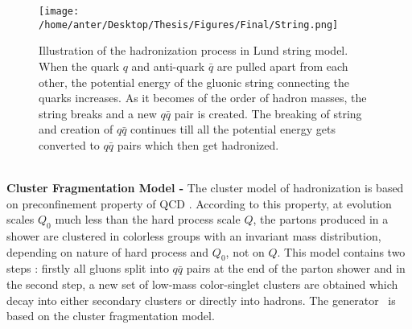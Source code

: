 \begin{figure}[!h]
\begin{center}
\hspace*{-4mm}
\texttt{[image: /home/anter/Desktop/Thesis/Figures/Final/String.png]}\\
\vspace*{4mm}
\caption[Illustration of the hadronization process in Lund string model.]{Illustration of the hadronization process in Lund string model\footnotemark. When the quark $q$ and anti-quark $\bar{q}$ are pulled apart from each other, the potential energy of the gluonic string connecting the quarks increases. As it becomes of the order of hadron masses, the string breaks and a new $q\bar{q}$ pair is created. The breaking of string and creation of $q\bar{q}$ continues till all the potential energy gets converted to $q\bar{q}$ pairs which then get hadronized.}
\label{fig:string}
\end{center}
\end{figure} \\
{\bf Cluster Fragmentation  Model -} The cluster model of hadronization \cite{Marchesini:1987cf,Webber:1983if} is based on preconfinement property of QCD \cite{Amati:1979fg}. According to this property, at evolution scales $Q_0$ much less than the hard process scale $Q$, the partons produced in a shower are clustered in colorless groups with an invariant mass distribution, depending on nature of hard process and $Q_0$, not on $Q$. This model contains two steps : firstly all gluons split into $q\bar{q}$ pairs at the end of the parton shower and in the second step, a new set of low-mass color-singlet clusters are obtained which decay into either secondary clusters or directly into hadrons. The generator \HERWIG~is based on the cluster fragmentation model. %

